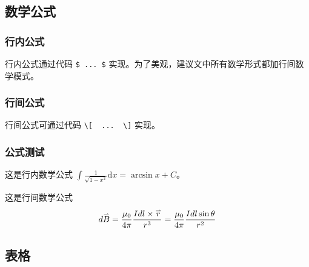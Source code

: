 \documentclass{imutthesis}
\begin{document}
\subsection{数学公式}

\subsubsection{行内公式}

行内公式通过代码 \verb|$ ... $| 实现。为了美观，建议文中所有数学形式都加行间数学模式。
\subsubsection{行间公式}
行间公式可通过代码 \verb|\[  ...  \]| 实现。
\subsubsection{公式测试}
这是行内数学公式
$ 	\int \frac{1}{\sqrt{1-x^{2}}}\mathrm{d}x= \arcsin x +C $。

这是行间数学公式
\begin{equation}
d \mathord{ \buildrel{ \lower3pt \hbox{$ \scriptscriptstyle \rightharpoonup$}} \over B} = \frac{{{ \mu _0}}}{{4 \pi }} \frac{{Idl \times \mathord{ \buildrel{ \lower3pt \hbox{$ \scriptscriptstyle \rightharpoonup$}} \over r} }}{{{r^3}}} =  \frac{{{ \mu _0}}}{{4 \pi }} \frac{{Idl \sin \theta }}{{{r^2}}} 
\end{equation}

\subsection{表格}
\end{document}
